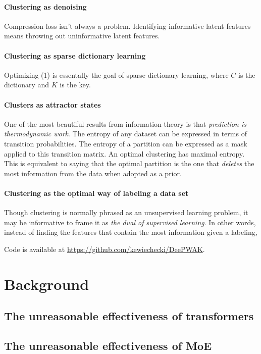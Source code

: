 \paragraph{Clustering as denoising}
Compression loss isn't always a problem.
Identifying informative latent features means throwing out uninformative latent features.

\paragraph{Clustering as sparse dictionary learning}
Optimizing (1) is essentally the goal of sparse dictionary learning, where
$C$ is the dictionary and $K$ is the key.


\paragraph{Clusters as attractor states}
One of the most beautiful results from information theory is that \textit{prediction is thermodynamic work}.
The entropy of any dataset can be expressed in terms of transition probabilities.
The entropy of a partition can be expressed as a mask applied to this transition matrix.
An optimal clustering has maximal entropy\cite{e17010151}.
This is equivalent to saying that the optimal partition is the one that \textit{deletes} the most information from the data when adopted as a prior.

\paragraph{Clustering as the optimal way of labeling a data set}
Though clustering is normally phrased as an unsupervised learning problem,
it may be informative to frame it as \textit{the dual of supervised learning}.
In other words, instead of finding the features that contain the most information given a labeling,


Code is available at \url{https://github.com/kewiechecki/DeePWAK}.

\section{Background}

\subsection{The unreasonable effectiveness of transformers}

\subsection{The unreasonable effectiveness of MoE}

